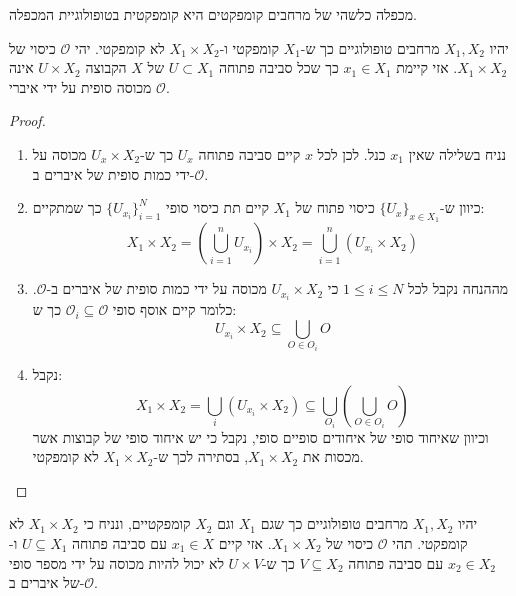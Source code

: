 \documentclass{tstextbook}
\begin{document}
\begin{theorem}[טיכונוב]
מכפלה כלשהי של מרחבים קומפקטים היא קומפקטית בטופולוגיית המכפלה.

\end{theorem}
\begin{lemma}
יהיו \(X_{1},X_{2}\) מרחבים טופולוגיים כך ש-\(X_{1}\) קומפקטי ו-\(X_{1} \times X_{2}\) לא קומפקטי. יהי \(\mathcal{O}\) כיסוי של \(X_{1} \times X_{2}\). אזי קיימת \(x_{1} \in X_{1}\) כך שכל סביבה פתוחה \(U\subset X_{1}\) של \(X\) הקבוצה \(U\times X_{2}\) אינה מכוסה סופית על ידי איברי \(\mathcal{O}\).

\end{lemma}
\begin{proof}
  \begin{enumerate}
    \item נניח בשלילה שאין \(x_{1}\) כנל. לכן לכל \(x\) קיים סביבה פתוחה \(U_{x}\) כך ש-\(U_{x}\times X_{2}\) מכוסה על ידי כמות סופית של איברים ב-\(\mathcal{O}\). 


    \item כיוון ש-\(\{ U_{x} \}_{x \in X_{1}}\) כיסוי פתוח של \(X_{1}\) קיים תת כיסוי סופי \(\{ U_{x_{i}} \}_{i=1}^{N}\) כך שמתקיים: 
$$X_{1}\times X_{2}=\left( \bigcup_{i=1}^{n}U_{x_{i}} \right)\times X_{2}=\bigcup_{i=1}^{n}\left( U_{x_{i}}\times X_{2} \right)$$


    \item מההנחה נקבל לכל \(1\leq i\leq N\) כי \(U_{x_{i}} \times X_{2}\) מכוסה על ידי כמות סופית של איברים ב-\(\mathcal{O}\). כלומר קיים אוסף סופי \(\mathcal{O}_{i}\subseteq \mathcal{O}\) כך ש: 
$$U_{x_{i}}\times X_{2}\subseteq\bigcup_{O\in O_{i}}O$$


    \item נקבל: 
$$X_{1}\times X_{2}=\bigcup_{i}\left( U_{x_{i}}\times X_{2} \right)\subseteq \bigcup_{O_{i}}\left( \bigcup_{O\in O_{i}}O \right)$$
וכיוון שאיחוד סופי של איחודים סופיים סופי, נקבל כי יש איחוד סופי של קבוצות אשר מכסות את \(X_{1}\times X_{2}\), בסתירה לכך ש-\(X_{1}\times X_{2}\) לא קומפקטי.


  \end{enumerate}
\end{proof}
\begin{lemma}
יהיו \(X_{1},X_{2}\) מרחבים טופולוגיים כך שגם \(X_{1}\) וגם \(X_{2}\) קומפקטיים, ונניח כי \(X_{1} \times X_{2}\) לא קומפקטי. תהי \(\mathcal{O}\) כיסוי של \(X_{1} \times X_{2}\). אזי קיים \(x_{1} \in X\) עם סביבה פתוחה \(U\subseteq X_{1}\) ו-\(x_{2}\in X_{2}\) עם סביבה פתוחה \(V \subseteq X_{2}\) כך ש-\(U\times V\) לא יכול להיות מכוסה על ידי מספר סופי של איברים ב-\(\mathcal{O}\).

\end{lemma}
\end{document}
